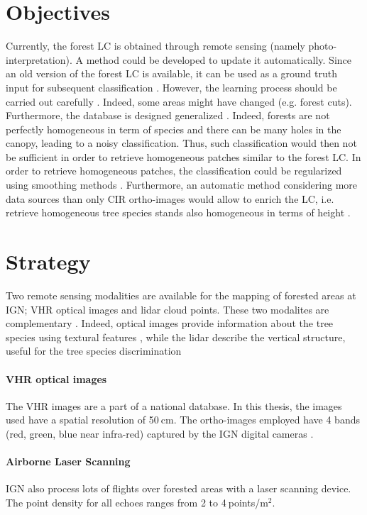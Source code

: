 \section{Objectives}
Currently, the forest LC is obtained through remote sensing (namely photo-inter\-pretation). A method could be developed to update it automatically. Since an old version of the forest LC is available, it can be used as a ground truth input for subsequent classification \citep{gressin2013updating}. However, the learning process should be carried out carefully \citep{gressin2014updating}. Indeed, some areas might have changed (e.g. forest cuts). Furthermore, the database is designed generalized \citep{smith1977database}. Indeed, forests are not perfectly homogeneous in term of species and there can be many holes in the canopy, leading to a noisy classification. Thus, such classification would then not be sufficient in order to retrieve homogeneous patches similar to the forest LC. In order to retrieve homogeneous patches, the classification could be regularized using smoothing methods \citep{schindler2012overview}. Furthermore, an automatic method considering more data sources than only CIR ortho-images would allow to enrich the LC, i.e. retrieve homogeneous tree species stands also homogeneous in terms of height \citep{gressin2014unified}.

\section{Strategy}
Two remote sensing modalities are available for the mapping of forested areas at IGN; VHR optical images and lidar cloud points. These two modalites are complementary \citep{torabzadeh2014fusion}. Indeed, optical images provide information about the tree species using textural features \citep{franklin2000incorporating}, while the lidar describe the vertical structure, useful for the tree species discrimination \citep{dalponte2012tree, dalponte2014tree}

\paragraph{VHR optical images \\}
The VHR images are a part of a national database. In this thesis, the images used have a spatial resolution of 50$\:$cm. The ortho-images employed have 4 bands (red, green, blue near infra-red) captured by the IGN digital cameras \citep{souchon2012large}. \\
\paragraph{Airborne Laser Scanning \\}
IGN also process lots of flights over forested areas with a laser scanning device. The point density for all echoes ranges from 2 to 4$\:$points/m$^{2}$. \\

